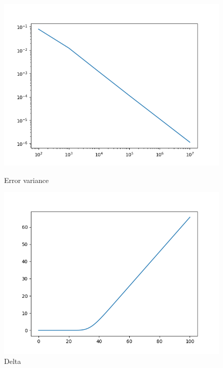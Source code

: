 \documentclass[a4paper,11pt]{scrartcl}
\begin{document}
\begin{enumerate}
\begin{enumerate}[leftmargin=1em]
\begin{figure}[h]
    \begin{minipage}[b]{.5\linewidth}
      \centering
      \includegraphics[width=\linewidth]{error_var.png}
      \caption{Error variance}
      \label{fig:error_var}
    \end{minipage}%
    \begin{minipage}[b]{.5\linewidth}
      \centering
      \includegraphics[width=\linewidth]{delta_f.png}
      \caption{Delta}
      \label{fig:delta}
    \end{minipage}
\end{figure}

\end{enumerate}


\end{enumerate}
\end{document}
